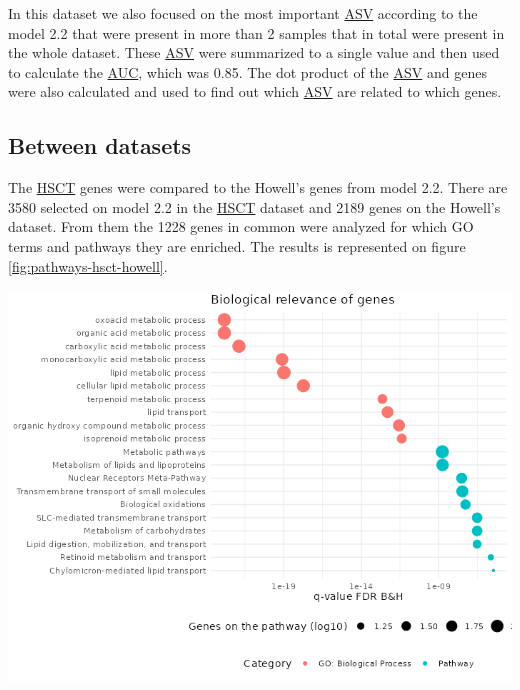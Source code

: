 \documentclass[
  12pt,
  a4paper,
  twoside,
  openright]{book}
\let\origfigure\figure
\let\endorigfigure\endfigure
\renewenvironment{figure}[1][2] {
    \expandafter\origfigure\expandafter[!htbp]
} {
    \endorigfigure
}
\begin{document}
In this dataset we also focused on the most important \protect\hyperlink{acronyms_ASV}{ASV} according to the model 2.2 that were present in more than 2 samples that in total were present in the whole dataset.
These \protect\hyperlink{acronyms_ASV}{ASV} were summarized to a single value and then used to calculate the \protect\hyperlink{acronyms_AUC}{AUC}, which was 0.85.
The dot product of the \protect\hyperlink{acronyms_ASV}{ASV} and genes were also calculated and used to find out which \protect\hyperlink{acronyms_ASV}{ASV} are related to which genes.

\FloatBarrier

\hypertarget{between-datasets}{%
\subsection{Between datasets}\label{between-datasets}}

The \protect\hyperlink{acronyms_HSCT}{HSCT} genes were compared to the Howell's genes from model 2.2.
There are 3580 selected on model 2.2 in the \protect\hyperlink{acronyms_HSCT}{HSCT} dataset and 2189 genes on the Howell's dataset.
From them the 1228 genes in common were analyzed for which GO terms and pathways they are enriched.
The results is represented on figure \ref{fig:pathways-hsct-howell}.

\begin{figure}
\includegraphics[width=1\linewidth]{images/pathways_hsct_howell} \caption[Pathways from common genes in HSCT and Howell's dataset.]{Significance of pathways on common genes in HSCT and Howell's dataset ordered by p-value, size according to the number of genes on the pathway found on the dataset and color blue for pathways and red for gene ontologies of biological process.}\label{fig:pathways-hsct-howell}
\end{figure}
\end{document}
